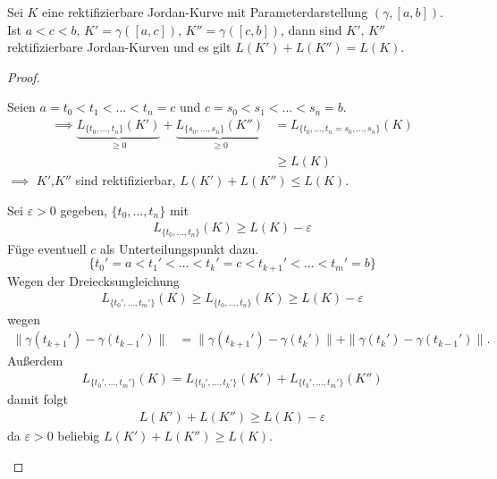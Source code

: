 \documentclass[a4paper,10pt]{scrbook}
\begin{document}

\begin{theorem}[Hilfssatz] \label{thm:6.12}
  Sei $K$ eine rektifizierbare Jordan-Kurve mit Parameterdarstellung $(\gamma,[a,b])$. Ist $a < c < b$, $K' = \gamma([a,c])$, $K'' = \gamma([c,b])$, dann sind $K'$, $K''$ rektifizierbare Jordan-Kurven und es gilt $L(K') + L(K'') = L(K)$.

  \begin{proof}
    \begin{enum-arab}
      \item Seien $a = t_0 < t_1 < \ldots < t_n = c$ und $c = s_0 < s_1 < \ldots < s_n = b$.
      \begin{align*}
        \implies
        \underbrace{L_{\{t_0,\ldots,t_n\}}(K')}_{\geq 0}
        + \underbrace{L_{\{s_0,\ldots,s_n\}}(K'')}_{\geq 0}
        &= L_{\{t_0,\ldots,t_n=s_0,\ldots,s_n\}}(K) \\
        &\geq L(K)
      \end{align*}
      $\implies$ $K'$,$K''$ sind rektifizierbar, $L(K') + L(K'') \leq L(K)$.

      \item Sei $\varepsilon > 0$ gegeben, $\{t_0,\ldots,t_n\}$ mit
      \begin{align*}
        L_{\{t_0,\ldots,t_n\}}(K) \geq L(K) - \varepsilon
      \end{align*}
      Füge eventuell $c$ als Unterteilungspunkt dazu. \[\{t_0' = a < t_1' < \ldots < t_k' = c < t_{k+1}' < \ldots < t_m' = b\}\] Wegen der Dreiecksungleichung
      \begin{align*}
        L_{\{t_0',\ldots,t_m'\}}(K) \geq L_{\{t_0,\ldots,t_n\}}(K) \geq L(K) - \varepsilon
      \end{align*}
      wegen
      \begin{align*}
        \|\gamma(t_{k+1}')-\gamma(t_{k-1}')\| &= \|\gamma(t_{k+1}')-\gamma(t_{k}')\| + \|\gamma(t_{k}')-\gamma(t_{k-1}')\|.
      \end{align*}
      Außerdem
      \begin{align*}
        L_{\{t_0',\ldots,t_m'\}}(K) = L_{\{t_0',\ldots,t_k'\}}(K') + L_{\{t_k',\ldots,t_m'\}}(K'')
      \end{align*}
      damit folgt
      \begin{align*}
        L(K') + L(K'') \geq L(K) - \varepsilon
      \end{align*}
      da $\varepsilon > 0$ beliebig $L(K') + L(K'') \geq L(K)$.


\end{enum-arab}
\end{proof}
\end{theorem}
\end{document}
